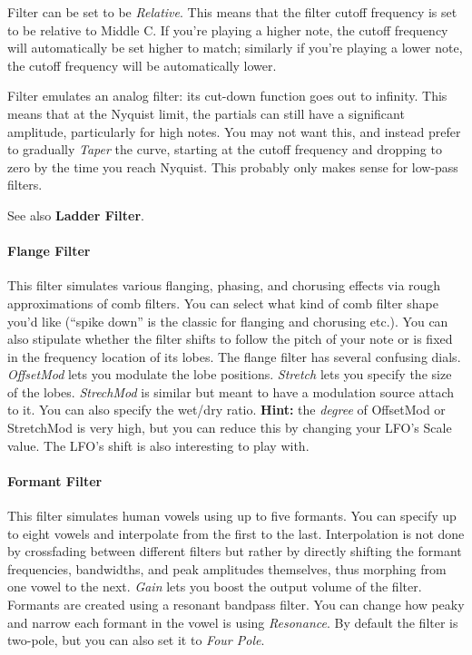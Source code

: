 \documentclass{article}
\begin{document}
Filter can be set to be {\it Relative}.  This means that the filter cutoff frequency is set to be relative to Middle C.  If you're playing a higher note, the cutoff frequency will automatically be set higher to match; similarly if you're playing a lower note, the cutoff frequency will be automatically lower.

Filter emulates an analog filter: its cut-down function goes out to infinity. This means that at the Nyquist limit, the partials can still have a significant amplitude, particularly for high notes.  You may not want this, and instead prefer to gradually {\it Taper} the curve, starting at the cutoff frequency and dropping to zero by the time you reach Nyquist.  This probably only makes sense for low-pass filters.

See also {\bf Ladder Filter}.




\paragraph{Flange Filter} This filter simulates various flanging, phasing, and chorusing effects via rough approximations of comb filters.  You can select what kind of comb filter shape you'd like (``spike down'' is the classic for flanging and chorusing etc.).    You can also stipulate whether the filter shifts to follow the pitch of your note or is fixed in the frequency location of its lobes.    The flange filter has several confusing dials.  {\it OffsetMod} lets you modulate the lobe positions.  {\it Stretch} lets you specify the size of the lobes.  {\it StrechMod} is similar but meant to have a modulation source attach to it.  You can also specify the wet/dry ratio. {\bf Hint:}  the {\it degree} of OffsetMod or StretchMod is very high, but you can reduce this by changing your LFO's Scale value.  The LFO's shift is also interesting to play with.

\paragraph{Formant Filter} This filter simulates human vowels using up to five formants.  You can specify up to eight vowels and interpolate from the first to the last. Interpolation is not done by crossfading between different filters but rather by directly shifting the formant frequencies, bandwidths, and peak amplitudes themselves, thus morphing from one vowel to the next.   {\it Gain} lets you boost the output volume of the filter.  Formants are created using a resonant bandpass filter.  You can change how peaky and narrow each formant in the vowel is using {\it Resonance}.  By default the filter is two-pole, but you can also set it to {\it Four Pole}.
\end{document}

